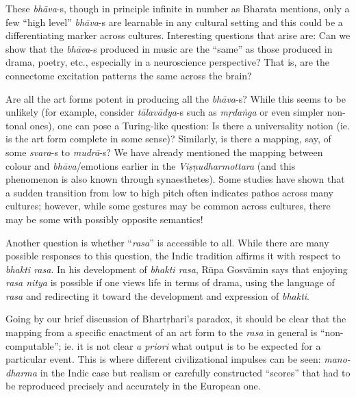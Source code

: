 These \textsl{bhāva}-s, though in principle infinite in number as Bharata mentions, only a few “high level” \textsl{bhāva}-s are learnable in any cultural setting and this could be a differentiating marker across cultures. Interesting questions that arise are: Can we show that the \hbox{\textsl{bhāva}-s} produced in music are the “same” as those produced in drama, poetry, etc., especially in a neuroscience perspective? That is, are the connectome excitation patterns the same across the brain?

Are all the art forms potent in producing all the \textsl{bhāva}-s? While this seems to be unlikely (for example, consider \textsl{tālavādya}-s such as \textsl{mṛdaṅga} or even simpler non-tonal ones), one can pose a Turing-like question: Is there a universality notion (ie. is the art form complete in some sense)? Similarly, is there a mapping, say, of some \hbox{\textsl{svara}-s} to \textsl{mudrā}-s? We have already mentioned the mapping between colour and \textsl{bhāva}/emotions earlier in the \textsl{Viṣṇudharmottara} (and this phenomenon is also known through synaesthetes). Some studies have shown that a sudden transition from low to high pitch often indicates pathos across many cultures; however, while some gestures may be common across cultures, there may be some with possibly opposite semantics!

Another question is whether “\textsl{rasa}” is accessible to all. While there are many possible responses to this question, the Indic tradition affirms it with respect to \textsl{bhakti rasa}.  In his development of \textsl{bhakti rasa}, Rūpa Gosvāmin says that enjoying \textsl{rasa nitya} is possible if one views life in terms of drama, using the language of \textsl{rasa} and redirecting it toward the development and expression of \textsl{bhakti}.

Going by our brief discussion of Bhartṛhari’s paradox, it should be clear that the mapping from a specific enactment of an art form to the \textsl{rasa} in general is “non-computable”; ie. it is not clear \textsl{a priori} what output is to be expected for a particular event. This is where different civilizational impulses can be seen: \textsl{mano-dharma} in the Indic case but realism or carefully constructed “scores” that had to be reproduced precisely and accurately in the European one. 

